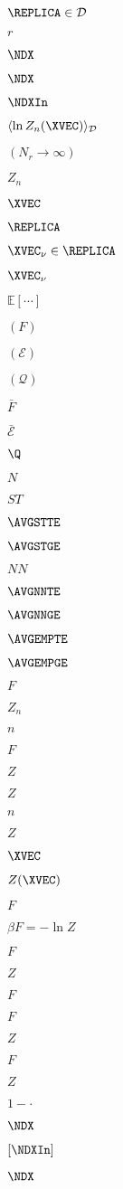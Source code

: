 $\REPLICA\in\mathcal{D}$

$r$

$\NDX$

$\NDX$

$\NDXIn$

$\langle \ln Z_{n}(\XVEC) \rangle_{\mathcal{D}}$

$(N_r\rightarrow\infty)$

$Z_{n}$

$\XVEC$

$\REPLICA$

$\XVEC_{\nu}\in\REPLICA$

$\XVEC_{\nu}$

$\mathbb{E}[\cdots]$

$(F)$

$(\mathcal{E})$

$(\mathcal{Q})$

$\bar{F}$

$\bar{\mathcal{E}}$

$\Q$

$N$

$ST$

$\AVGSTTE$

$\AVGSTGE$

$NN$

$\AVGNNTE$

$\AVGNNGE$

$\AVGEMPTE$

$\AVGEMPGE$

$F$

$Z_{n}$

$n$

$F$

$Z$

$Z$

$n$

$Z$

$\XVEC$

$Z(\XVEC)$

$F$

$\beta F=-\ln Z$

$F$

$Z$

$F$

$F$

$Z$

$F$

$Z$

$1 - \cdot$

$\NDX$

$[\NDXIn]$

$\NDX$

